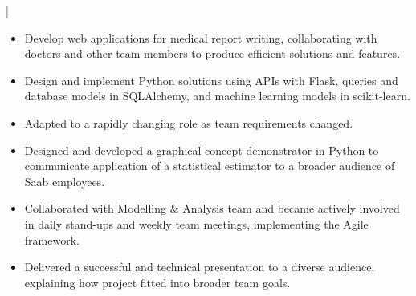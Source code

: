\documentclass[11pt,a4paper,academicons]{altacv}
\begin{document}
\begin{fullwidth}
\begin{itemize}
	\end{itemize}

	| 
	\skill{\LaTeX}


	\begin{itemize}
		\item Develop web applications for medical report writing, collaborating with doctors and other team members to produce efficient solutions and features.

		\item Design and implement Python solutions using APIs with Flask, queries and database models in SQLAlchemy, and machine learning models in scikit-learn.

		\item Adapted to a rapidly changing role as team requirements changed.

	\end{itemize}

	\divider

	\begin{itemize}
		\item Designed and developed a graphical concept demonstrator in Python to communicate application of a statistical estimator to a broader audience of Saab employees.

		\item Collaborated with Modelling \& Analysis team and became actively involved in daily stand-ups and weekly team meetings, implementing the Agile framework.


		\item Delivered a successful and technical presentation to a diverse audience, explaining how project fitted into broader team goals.

	\end{itemize}


\end{fullwidth}
\newpage
\end{document}
